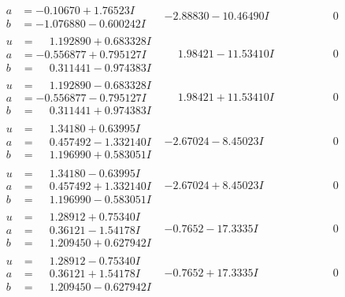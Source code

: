 \documentclass[1p]{elsarticle_modified}
\theoremstyle{definition}
\begin{document}
$$\begin{array}{c|c|c}
\begin{aligned}
a &= -0.10670 + 1.76523 I \\
b &= -1.076880 - 0.600242 I\end{aligned}
 & -2.88830 - 10.46490 I & \phantom{-0.000000 } 0 \\ \hline\begin{aligned}
u &= \phantom{-}1.192890 + 0.683328 I \\
a &= -0.556877 + 0.795127 I \\
b &= \phantom{-}0.311441 - 0.974383 I\end{aligned}
 & \phantom{-}1.98421 - 11.53410 I & \phantom{-0.000000 } 0 \\ \hline\begin{aligned}
u &= \phantom{-}1.192890 - 0.683328 I \\
a &= -0.556877 - 0.795127 I \\
b &= \phantom{-}0.311441 + 0.974383 I\end{aligned}
 & \phantom{-}1.98421 + 11.53410 I & \phantom{-0.000000 } 0 \\ \hline\begin{aligned}
u &= \phantom{-}1.34180 + 0.63995 I \\
a &= \phantom{-}0.457492 - 1.332140 I \\
b &= \phantom{-}1.196990 + 0.583051 I\end{aligned}
 & -2.67024 - 8.45023 I & \phantom{-0.000000 } 0 \\ \hline\begin{aligned}
u &= \phantom{-}1.34180 - 0.63995 I \\
a &= \phantom{-}0.457492 + 1.332140 I \\
b &= \phantom{-}1.196990 - 0.583051 I\end{aligned}
 & -2.67024 + 8.45023 I & \phantom{-0.000000 } 0 \\ \hline\begin{aligned}
u &= \phantom{-}1.28912 + 0.75340 I \\
a &= \phantom{-}0.36121 - 1.54178 I \\
b &= \phantom{-}1.209450 + 0.627942 I\end{aligned}
 & -0.7652 - 17.3335 I & \phantom{-0.000000 } 0 \\ \hline\begin{aligned}
u &= \phantom{-}1.28912 - 0.75340 I \\
a &= \phantom{-}0.36121 + 1.54178 I \\
b &= \phantom{-}1.209450 - 0.627942 I\end{aligned}
 & -0.7652 + 17.3335 I & \phantom{-0.000000 } 0 \\ \hline\begin{aligned}

\end{aligned}
\end{array}$$
\end{document}
